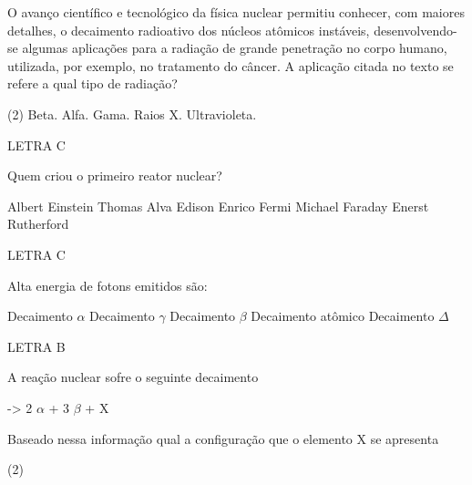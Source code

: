\documentclass[9 pt]{scrartcl}
\begin{document}
\begin{exercise}[points=1.0]
O avanço científico e tecnológico da física nuclear permitiu conhecer, com maiores detalhes, o decaimento radioativo dos núcleos atômicos instáveis, desenvolvendo-se algumas aplicações para a radiação de grande penetração no corpo humano, utilizada, por exemplo, no tratamento do câncer. A aplicação citada no texto se refere a qual tipo de radiação?

\begin{choice}(2)
\choice Beta.
\choice Alfa.
\choice Gama.
\choice Raios X.
\choice Ultravioleta. 
\end{choice}
\end{exercise}
\begin{solution}
LETRA C
\end{solution}




\begin{exercise}[points=1.0]
Quem criou o primeiro reator nuclear?

\begin{choice}
\choice Albert Einstein
\choice Thomas Alva Edison
\choice Enrico Fermi
\choice Michael Faraday
\choice Enerst Rutherford
\end{choice}
\end{exercise}
\begin{solution}
LETRA C
\end{solution}



\begin{exercise}[points=1.0]
Alta energia de fotons emitidos são:

\begin{choice}
\choice Decaimento \(\alpha\)
\choice Decaimento \(\gamma\)
\choice Decaimento \(\beta\)
\choice Decaimento atômico
\choice Decaimento \(\Delta\)
\end{choice}
\end{exercise}
\begin{solution}
LETRA B
\end{solution}




\begin{exercise}[points=1.0]
A reação nuclear sofre o seguinte decaimento
\begin{reaction*}
 ->  2 $\alpha$ + 3 $\beta$ + X
\end{reaction*}

Baseado nessa informação qual a configuração que o elemento X se apresenta

\begin{choice} (2)
\choice {}
\choice {}
\choice {}
\choice {}
\choice {}
\end{choice}
\end{exercise}
\end{document}
